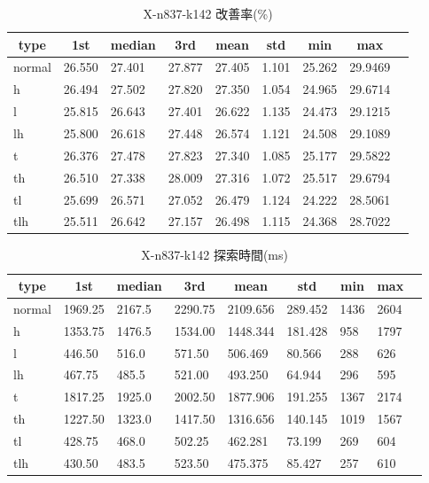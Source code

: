 \begin{table}[htbp]
    \caption{X-n837-k142 改善率(\%)}
    \begin{tabular}{|l|l|l|l|l|l|l|l|l|}\hline
    \multicolumn{1}{|c|}{\textbf{type}}
    &\multicolumn{1}{|c|}{\textbf{1st}}
    &\multicolumn{1}{c|}{\textbf{median}}
    &\multicolumn{1}{c|}{\textbf{3rd}}
    &\multicolumn{1}{c|}{\textbf{mean}}
    &\multicolumn{1}{c|}{\textbf{std}}
    &\multicolumn{1}{c|}{\textbf{min}}
    &\multicolumn{1}{c|}{\textbf{max}}\\\hline
	normal & 26.550 & 27.401 & 27.877 & 27.405 & 1.101 & 25.262 & 29.9469\\\hline
	h & 26.494 & 27.502 & 27.820 & 27.350 & 1.054 & 24.965 & 29.6714\\\hline
	l & 25.815 & 26.643 & 27.401 & 26.622 & 1.135 & 24.473 & 29.1215\\\hline
	lh & 25.800 & 26.618 & 27.448 & 26.574 & 1.121 & 24.508 & 29.1089\\\hline
	t & 26.376 & 27.478 & 27.823 & 27.340 & 1.085 & 25.177 & 29.5822\\\hline
	th & 26.510 & 27.338 & 28.009 & 27.316 & 1.072 & 25.517 & 29.6794\\\hline
	tl & 25.699 & 26.571 & 27.052 & 26.479 & 1.124 & 24.222 & 28.5061\\\hline
	tlh & 25.511 & 26.642 & 27.157 & 26.498 & 1.115 & 24.368 & 28.7022\\\hline
	\end{tabular}
\end{table}
\begin{table}[htbp]
    \caption{X-n837-k142 探索時間(ms)}
    \begin{tabular}{|l|l|l|l|l|l|l|l|l|}\hline
    \multicolumn{1}{|c|}{\textbf{type}}
    &\multicolumn{1}{|c|}{\textbf{1st}}
    &\multicolumn{1}{c|}{\textbf{median}}
    &\multicolumn{1}{c|}{\textbf{3rd}}
    &\multicolumn{1}{c|}{\textbf{mean}}
    &\multicolumn{1}{c|}{\textbf{std}}
    &\multicolumn{1}{c|}{\textbf{min}}
    &\multicolumn{1}{c|}{\textbf{max}}\\\hline
	normal & 1969.25 & 2167.5 & 2290.75 & 2109.656 & 289.452 & 1436 & 2604\\\hline
	h & 1353.75 & 1476.5 & 1534.00 & 1448.344 & 181.428 & 958 & 1797\\\hline
	l & 446.50 & 516.0 & 571.50 & 506.469 & 80.566 & 288 & 626\\\hline
	lh & 467.75 & 485.5 & 521.00 & 493.250 & 64.944 & 296 & 595\\\hline
	t & 1817.25 & 1925.0 & 2002.50 & 1877.906 & 191.255 & 1367 & 2174\\\hline
	th & 1227.50 & 1323.0 & 1417.50 & 1316.656 & 140.145 & 1019 & 1567\\\hline
	tl & 428.75 & 468.0 & 502.25 & 462.281 & 73.199 & 269 & 604\\\hline
	tlh & 430.50 & 483.5 & 523.50 & 475.375 & 85.427 & 257 & 610\\\hline
	\end{tabular}
\end{table}
